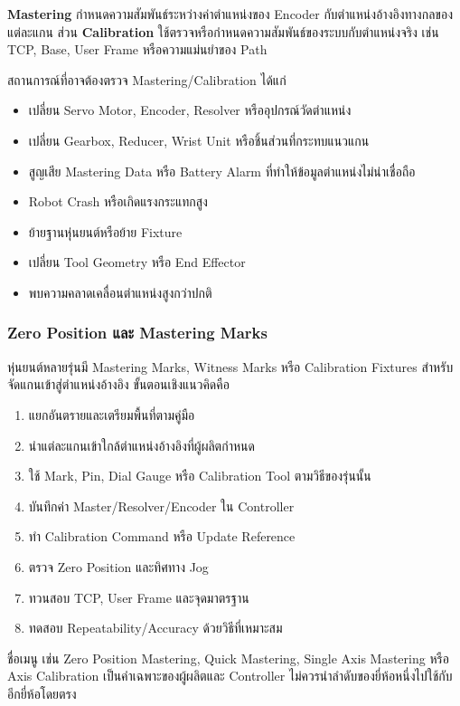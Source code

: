\textbf{Mastering} กำหนดความสัมพันธ์ระหว่างค่าตำแหน่งของ Encoder กับตำแหน่งอ้างอิงทางกลของแต่ละแกน ส่วน \textbf{Calibration} ใช้ตรวจหรือกำหนดความสัมพันธ์ของระบบกับตำแหน่งจริง เช่น TCP, Base, User Frame หรือความแม่นยำของ Path

สถานการณ์ที่อาจต้องตรวจ Mastering/Calibration ได้แก่

\begin{itemize}
    \item เปลี่ยน Servo Motor, Encoder, Resolver หรืออุปกรณ์วัดตำแหน่ง
    \item เปลี่ยน Gearbox, Reducer, Wrist Unit หรือชิ้นส่วนที่กระทบแนวแกน
    \item สูญเสีย Mastering Data หรือ Battery Alarm ที่ทำให้ข้อมูลตำแหน่งไม่น่าเชื่อถือ
    \item Robot Crash หรือเกิดแรงกระแทกสูง
    \item ย้ายฐานหุ่นยนต์หรือย้าย Fixture
    \item เปลี่ยน Tool Geometry หรือ End Effector
    \item พบความคลาดเคลื่อนตำแหน่งสูงกว่าปกติ
\end{itemize}

\subsubsection{Zero Position และ Mastering Marks}

หุ่นยนต์หลายรุ่นมี Mastering Marks, Witness Marks หรือ Calibration Fixtures สำหรับจัดแกนเข้าสู่ตำแหน่งอ้างอิง ขั้นตอนเชิงแนวคิดคือ

\begin{enumerate}
    \item แยกอันตรายและเตรียมพื้นที่ตามคู่มือ
    \item นำแต่ละแกนเข้าใกล้ตำแหน่งอ้างอิงที่ผู้ผลิตกำหนด
    \item ใช้ Mark, Pin, Dial Gauge หรือ Calibration Tool ตามวิธีของรุ่นนั้น
    \item บันทึกค่า Master/Resolver/Encoder ใน Controller
    \item ทำ Calibration Command หรือ Update Reference
    \item ตรวจ Zero Position และทิศทาง Jog
    \item ทวนสอบ TCP, User Frame และจุดมาตรฐาน
    \item ทดสอบ Repeatability/Accuracy ด้วยวิธีที่เหมาะสม
\end{enumerate}

ชื่อเมนู เช่น Zero Position Mastering, Quick Mastering, Single Axis Mastering หรือ Axis Calibration เป็นคำเฉพาะของผู้ผลิตและ Controller ไม่ควรนำลำดับของยี่ห้อหนึ่งไปใช้กับอีกยี่ห้อโดยตรง

